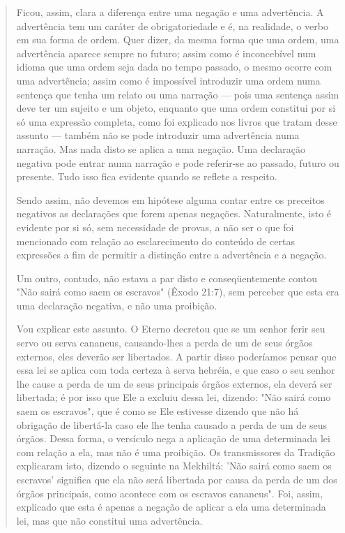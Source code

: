 \begin{quote}
Ficou, assim, clara a diferença entre uma negação e uma advertên­cia. A
advertência tem um caráter de obrigatoriedade e é, na realidade, o verbo
em sua forma de ordem. Quer dizer, da mesma forma que uma ordem, uma
advertência aparece sempre no futuro; assim como é inconcebível num
idioma que uma ordem seja dada no tempo passado, o mesmo ocorre com uma
adver­tência; assim como é impossível introduzir uma ordem numa sentença
que te­nha um relato ou uma narração --- pois uma sentença assim deve
ter um sujeito e um objeto, enquanto que uma ordem constitui por si só
uma expressão com­pleta, como foi explicado nos livros que tratam desse
assunto --- também não se pode introduzir uma advertência numa narração.
Mas nada disto se aplica a uma negação. Uma declaração negativa pode
entrar numa narração e pode referir-se ao passado, futuro ou presente.
Tudo isso fica evidente quando se reflete a respeito.

Sendo assim, não devemos em hipótese alguma contar entre os pre­ceitos
negativos as declarações que forem apenas negações. Naturalmente, isto é
evidente por si só, sem necessidade de provas, a não ser o que foi
menciona­do com relação ao esclarecimento do conteúdo de certas
expressões a fim de permitir a distinção entre a advertência e a
negação.

Um outro, contudo, não estava a par disto e conseqüentemente con­tou
"Não sairá como saem os escravos" (Êxodo 21:7), sem perceber que esta
era uma declaração negativa, e não uma proibição.

Vou explicar este assunto. O Eterno decretou que se um senhor fe­rir seu
servo ou serva cananeus, causando-lhes a perda de um de seus órgãos
externos, eles deverão ser libertados. A partir disso poderíamos pensar
que es­sa lei se aplica com toda certeza à serva hebréia, e que caso o
seu senhor lhe cause a perda de um de seus principais órgãos externos,
ela deverá ser liberta­da; é por isso que Ele a excluiu dessa lei,
dizendo: "Não sairá como saem os escravos", que é como se Ele estivesse
dizendo que não há obrigação de liber­tá-la caso ele lhe tenha causado a
perda de um de seus órgãos. Dessa forma, o versículo nega a aplicação de
uma determinada lei com relação a ela, mas não é uma proibição. Os
transmissores da Tradição explicaram isto, dizendo o se­guinte na
Mekhiltá: 'Não sairá como saem os escravos' significa que ela não será
libertada por causa da perda de um dos órgãos principais, como acontece
com os escravos cananeus". Foi, assim, explicado que esta é apenas a
negação de aplicar a ela uma determinada lei, mas que não constitui uma
advertência.
\end{quote}

